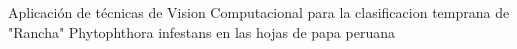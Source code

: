\begin{center}
	\vspace*{10cm}
	{Aplicación de técnicas de Vision Computacional para la clasificacion temprana de "Rancha" Phytophthora infestans en las hojas de papa peruana}
\end{center}

